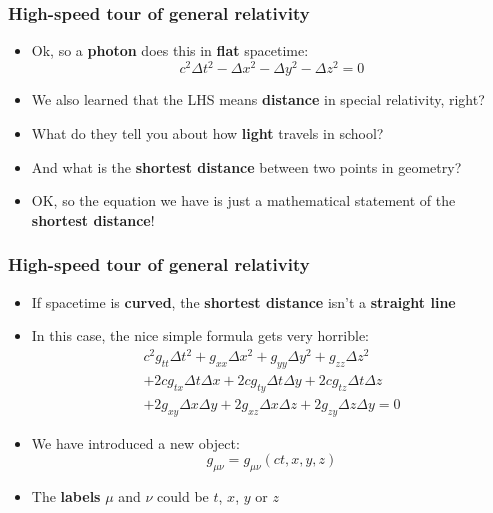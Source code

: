 \documentclass{beamer}
\begin{document}
\begin{frame}
  \frametitle{High-speed tour of general relativity}
  \begin{itemize}
    \item<1-> Ok, so a \textbf{photon} does this in \textbf{flat} spacetime:
      \begin{equation*}
	c^2\Delta t^2-\Delta x^2-\Delta y^2-\Delta z^2=0
      \end{equation*}
    \item<2-> We also learned that the LHS means \textbf{distance} in special relativity, right?
    \item<3-> What do they tell you about how \textbf{light} travels in school?
    \item<4-> And what is the \textbf{shortest distance} between two points in geometry? 
    \item<5-> OK, so the equation we have is just a mathematical statement of the \textbf{shortest distance}!
  \end{itemize}
\end{frame}

\begin{frame}
  \frametitle{High-speed tour of general relativity}
  \begin{itemize}
    \item<1-> If spacetime is \textbf{curved}, the \textbf{shortest distance} isn't a \textbf{straight line}
    \item<2-> In this case, the nice simple formula gets very horrible:
      \begin{gather*}
	c^2g_{tt}\Delta t^2+g_{xx}\Delta x^2+g_{yy}\Delta y^2+g_{zz}\Delta z^2\\
	+2cg_{tx}\Delta t\Delta x+2cg_{ty}\Delta t\Delta y+2cg_{tz}\Delta t\Delta z\\
	+2g_{xy}\Delta x\Delta y+2g_{xz}\Delta x\Delta z+2g_{zy}\Delta z\Delta y=0
      \end{gather*}
    \item<3-> We have introduced a new object:
      \begin{equation*}
	g_{\mu\nu}=g_{\mu\nu}(ct,x,y,z)
      \end{equation*}
    \item<4-> The \textbf{labels} $\mu$ and $\nu$ could be $t$, $x$, $y$ or $z$
  \end{itemize}
\end{frame}
\end{document}
